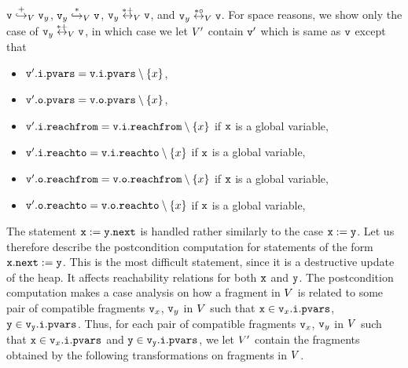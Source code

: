 \begin{enumerate}
  $\mathtt{v} \overset{+}\hookrightarrow_{V} \mathtt{v}_y$,
  $\mathtt{v}_y \overset{*}\hookrightarrow_{V} \mathtt{v}$,
  $\mathtt{v}_y \overset{*+}\leftrightarrow_{V} \mathtt{v}$, and
  $\mathtt{v}_y \overset{*\circ}\leftrightarrow_{V} \mathtt{v}$. For space reasons,
  we show only the case of $\mathtt{v}_y \overset{*+}\leftrightarrow_{V} \mathtt{v}$,
  in which case we let $V'$ contain $\mathtt{v}'$ which is same as $\mathtt{v}$ except that
\begin{itemize}
\item $\mathtt{v}'.\mathtt{i}.\mathtt{pvars} = \mathtt{v}.\mathtt{i}.\mathtt{pvars} \setminus \left\{x\right\}$,
\item $\mathtt{v}'.\mathtt{o}.\mathtt{pvars} = \mathtt{v}.\mathtt{o}.\mathtt{pvars} \setminus \left\{x\right\}$,
\item $\mathtt{v}'.\mathtt{i}.\mathtt{reachfrom} = \mathtt{v}.\mathtt{i}.\mathtt{reachfrom} \setminus \left\{x\right\}$ if $\tt x$ is a global variable,
\item $\mathtt{v}'.\mathtt{i}.\mathtt{reachto} = \mathtt{v}.\mathtt{i}.\mathtt{reachto} \setminus \left\{x\right\}$ if $\tt x$ is a global variable,
\item $\mathtt{v}'.\mathtt{o}.\mathtt{reachfrom} = \mathtt{v}.\mathtt{o}.\mathtt{reachfrom} \setminus \left\{x\right\}$ if $\tt x$ is a global variable,
\item $\mathtt{v}'.\mathtt{o}.\mathtt{reachto} = \mathtt{v}.\mathtt{o}.\mathtt{reachto} \setminus \left\{x\right\}$ if $\tt x$ is a global variable,
\end{itemize}
\end{enumerate}
The statement ${\tt x := y.next}$ is handled rather similarly to the 
case ${\tt x := y}$.
Let us therefore describe the postcondition computation for statements of the form
${\tt x.next:= y}$.
This is the most difficult statement, since it is a destructive update of the heap. It affects reachability relations for both $\mathtt{x}$ and $\mathtt{y}$.
The postcondition computation makes a case analysis on how a fragment
in $V$ is related to some pair of compatible fragments $\mathtt{v}_x$, $\mathtt{v}_y$ in $V$ such that $\mathtt{x} \in \mathtt{v}_x.\mathtt{i}.\mathtt{pvars}$, $\tt y \in \mathtt{v}_y.\mathtt{i}.\mathtt{pvars}$. 
Thus, for each pair of compatible fragments $\mathtt{v}_x$, $\mathtt{v}_y$ in $V$ such that $\mathtt{x} \in \mathtt{v}_x.\mathtt{i}.\mathtt{pvars}$ and $\tt y \in \mathtt{v}_y.\mathtt{i}.\mathtt{pvars}$,  we let $V'$ contain
the fragments obtained by the following transformations on fragments in
$V$.
